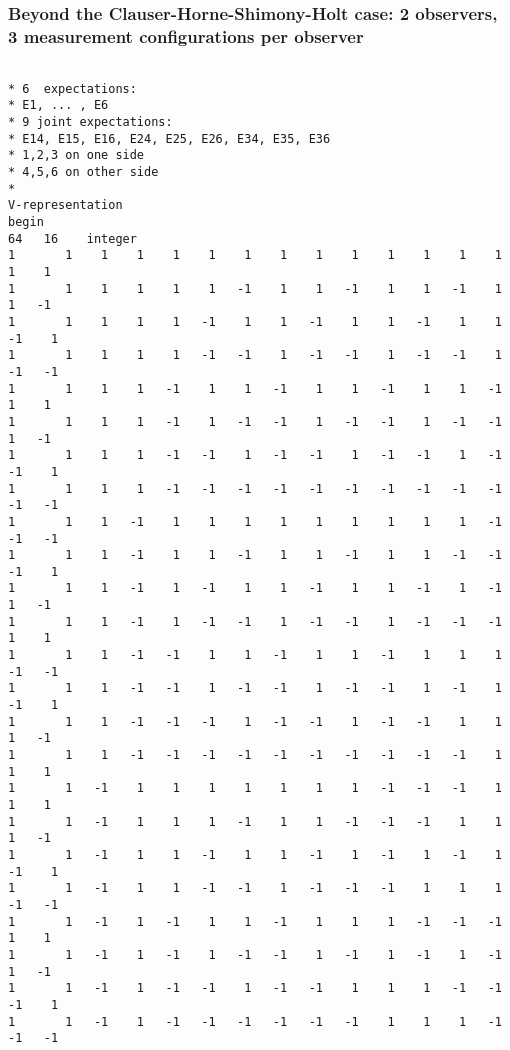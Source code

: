 \documentclass[%
  twocolumn,
 showpacs,
 showkeys,
 preprintnumbers,
 amsmath,amssymb,
 aps,
  pra,
  longbibliography,
 floatfix,
 ]{revtex4-1}
\begin{document}
\subsubsection{Beyond the Clauser-Horne-Shimony-Holt case: 2 observers, 3 measurement configurations per observer}
\label{2017-b-chshc1ba}

{ \begin{lstlisting}[backgroundcolor=\color{yellow!10},framerule=0pt,breaklines=true, frame=tb]

* 6  expectations:
* E1, ... , E6
* 9 joint expectations:
* E14, E15, E16, E24, E25, E26, E34, E35, E36
* 1,2,3 on one side
* 4,5,6 on other side
*
V-representation
begin
64   16    integer
1       1    1    1    1    1    1    1    1    1    1    1    1    1    1    1
1       1    1    1    1    1   -1    1    1   -1    1    1   -1    1    1   -1
1       1    1    1    1   -1    1    1   -1    1    1   -1    1    1   -1    1
1       1    1    1    1   -1   -1    1   -1   -1    1   -1   -1    1   -1   -1
1       1    1    1   -1    1    1   -1    1    1   -1    1    1   -1    1    1
1       1    1    1   -1    1   -1   -1    1   -1   -1    1   -1   -1    1   -1
1       1    1    1   -1   -1    1   -1   -1    1   -1   -1    1   -1   -1    1
1       1    1    1   -1   -1   -1   -1   -1   -1   -1   -1   -1   -1   -1   -1
1       1    1   -1    1    1    1    1    1    1    1    1    1   -1   -1   -1
1       1    1   -1    1    1   -1    1    1   -1    1    1   -1   -1   -1    1
1       1    1   -1    1   -1    1    1   -1    1    1   -1    1   -1    1   -1
1       1    1   -1    1   -1   -1    1   -1   -1    1   -1   -1   -1    1    1
1       1    1   -1   -1    1    1   -1    1    1   -1    1    1    1   -1   -1
1       1    1   -1   -1    1   -1   -1    1   -1   -1    1   -1    1   -1    1
1       1    1   -1   -1   -1    1   -1   -1    1   -1   -1    1    1    1   -1
1       1    1   -1   -1   -1   -1   -1   -1   -1   -1   -1   -1    1    1    1
1       1   -1    1    1    1    1    1    1    1   -1   -1   -1    1    1    1
1       1   -1    1    1    1   -1    1    1   -1   -1   -1    1    1    1   -1
1       1   -1    1    1   -1    1    1   -1    1   -1    1   -1    1   -1    1
1       1   -1    1    1   -1   -1    1   -1   -1   -1    1    1    1   -1   -1
1       1   -1    1   -1    1    1   -1    1    1    1   -1   -1   -1    1    1
1       1   -1    1   -1    1   -1   -1    1   -1    1   -1    1   -1    1   -1
1       1   -1    1   -1   -1    1   -1   -1    1    1    1   -1   -1   -1    1
1       1   -1    1   -1   -1   -1   -1   -1   -1    1    1    1   -1   -1   -1

\end{lstlisting}}
\end{document}
